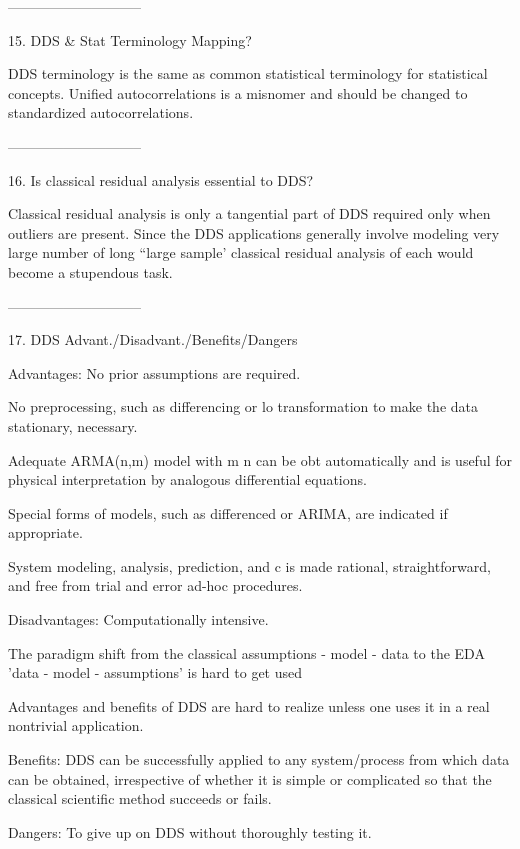 -----------------------------
 
15. DDS & Stat Terminology Mapping?
 
DDS terminology is the same as common statistical
terminology for statistical concepts.  Unified
autocorrelations is a misnomer and should be
changed to standardized autocorrelations.
 
-----------------------------
 
16. Is classical residual analysis essential to DDS?
 
Classical residual analysis is only a tangential
part of DDS required only when outliers are
present.  Since the DDS applications generally
involve modeling very large number of long ``large
sample' classical residual analysis of each would
become a stupendous task.
 
-----------------------------
 
17. DDS Advant./Disadvant./Benefits/Dangers
 
    Advantages:
       No prior assumptions are required.
 
       No preprocessing, such as differencing or lo
       transformation to make the data stationary,
       necessary.
 
       Adequate ARMA(n,m) model with m n can be obt
       automatically and is useful for physical
       interpretation by analogous differential
       equations.
 
       Special forms of models, such as differenced
       or ARIMA, are indicated if appropriate.
 
       System modeling, analysis, prediction, and c
       is made rational, straightforward, and free from
       trial and error ad-hoc procedures.
 
    Disadvantages:
       Computationally intensive.
 
       The paradigm shift from the classical
       assumptions - model - data to the EDA
       'data - model - assumptions' is hard to get used
 
       Advantages and benefits of DDS are hard to realize unless one uses it
       in a real nontrivial application.
 
   Benefits:
       DDS can be successfully applied to any
       system/process from which data can be obtained,
       irrespective of whether it is simple or
       complicated so that the classical scientific
       method succeeds or fails.
 
   Dangers:
       To give up on DDS without thoroughly testing it.
 
